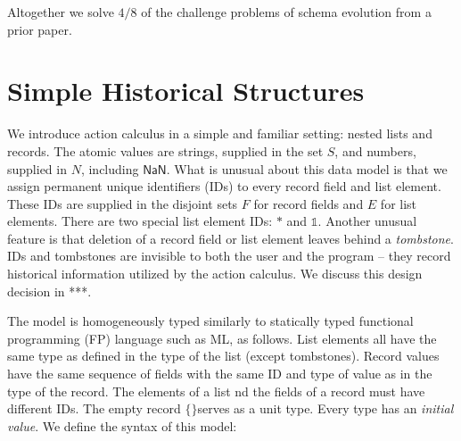 \documentclass[english,submission]{programming}
\theoremstyle{definition}
\newcommand{\mathbox}[1]{\colorbox{black!10}{$#1$}}
\newcommand{\emptystring}{\textsf{\textquotedbl\ \!\textquotedbl}}
\begin{document}
Altogether we solve $4/8$ of the challenge problems of schema evolution from a prior paper\cite{challenge-problems}.







\section{Simple Historical Structures}

We introduce action calculus in a simple and familiar setting: nested lists and records. The atomic values are strings, supplied in the set \mathbox{S}, and numbers, supplied in \mathbox{N}, including \mathbox{\textsf{NaN}}. What is unusual about this data model is that we assign permanent unique identifiers (IDs) to every record field and list element. These IDs are supplied in the disjoint sets \mathbox{F} for record fields and \mathbox{E} for list elements. There are two special list element IDs: \mathbox{*} and \mathbox{\mathbb{1}}. Another unusual feature is that deletion of a record field or list element leaves behind a \textit{tombstone}. IDs and tombstones are invisible to both the user and the program -- they record historical information utilized by the action calculus. We discuss this design decision in ***.

The model is homogeneously typed similarly to statically typed functional programming (FP) language such as ML, as follows. List elements all have the same type as defined in the type of the list (except tombstones). Record values have the same sequence of fields with the same ID and type of value as in the type of the record. The elements of a list nd the fields of a record must have different IDs.
The empty record \mathbox{\text{\{\}}}serves as a unit type. Every type has an \textit{initial value}. We define the syntax of this model:

\tcbox{
\[ \begin{array}{rl|rl|rl|l}
  \multicolumn{2}{l|}{\textrm{type}} & \multicolumn{2}{l|}{\textrm{value}} & \multicolumn{2}{l|}{\textrm{initial value}}&\\
  \hline
  T \Coloneqq & & v \Coloneqq & & T^\varnothing = & &\\
  &  \textsf{String} & & S & & \emptystring & \textrm{string}\\
  & \textsf{Number} & &  N & & \textsf{NaN} & \textrm{number}\\
  & \textsf{List } T & & [ E : v \  \dots ] & & [] & \textrm{list}\\
  & \{ F : T \  \dots \} & & \{ F : v \  \dots \} & & \{ F : T^\varnothing \  \dots \}& \textrm{record}\\

  & \bot && \bigtimes & & \bigtimes & \textrm{tombstone}\\
\end{array}\]
}
\end{document}
